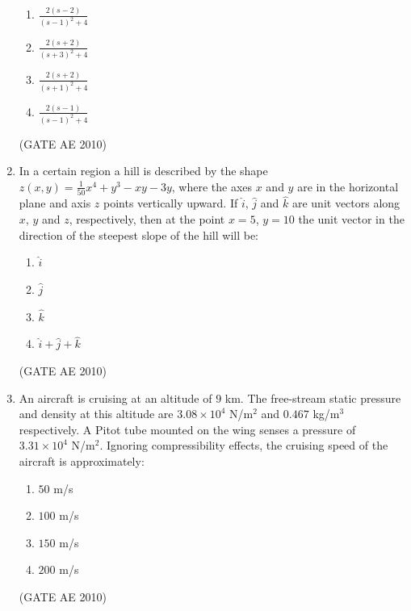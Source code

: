 \documentclass[journal]{IEEEtran}
\begin{document}
\begin{enumerate}
\begin{multicols}{4}
\begin{enumerate}
\item $\frac{2(s - 2)}{(s - 1)^2 + 4}$  
\item $\frac{2(s + 2)}{(s + 3)^2 + 4}$  
\item $\frac{2(s + 2)}{(s + 1)^2 + 4}$  
\item $\frac{2(s - 1)}{(s - 1)^2 + 4}$  
\end{enumerate}
\end{multicols}
\hfill (GATE AE 2010)

\item In a certain region a hill is described by the shape $z(x,y) = \frac{1}{50} x^4 + y^3 - xy - 3y$, where the axes $x$ and $y$ are in the horizontal plane and axis $z$ points vertically upward. If $\hat{i}$, $\hat{j}$ and $\hat{k}$ are unit vectors along $x$, $y$ and $z$, respectively, then at the point $x = 5$, $y = 10$ the unit vector in the direction of the steepest slope of the hill will be:

\begin{multicols}{4}
\begin{enumerate}
\item $\hat{i}$  
\item $\hat{j}$  
\item $\hat{k}$  
\item $\hat{i} + \hat{j} + \hat{k}$  
\end{enumerate}
\end{multicols}
\hfill (GATE AE 2010)

\item An aircraft is cruising at an altitude of $9$ km. The free-stream static pressure and density at this altitude are $3.08 \times 10^4$ N/m$^2$ and $0.467$ kg/m$^3$ respectively. A Pitot tube mounted on the wing senses a pressure of $3.31 \times 10^4$ N/m$^2$. Ignoring compressibility effects, the cruising speed of the aircraft is approximately:

\begin{multicols}{4}
\begin{enumerate}
\item $50$ m/s  
\item $100$ m/s  
\item $150$ m/s  
\item $200$ m/s  
\end{enumerate}
\end{multicols}
\hfill (GATE AE 2010)


\end{enumerate}
\end{document}
